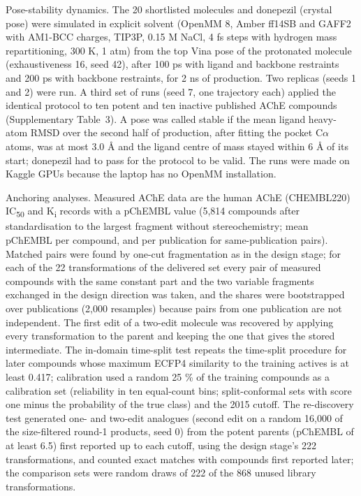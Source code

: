 \documentclass[11pt,a4paper]{article}
\begin{document}
Pose-stability dynamics. The 20 shortlisted molecules and donepezil (crystal pose) were simulated in explicit solvent (OpenMM 8, Amber ff14SB and GAFF2 with AM1-BCC charges, TIP3P, 0.15 M NaCl, 4 fs steps with hydrogen mass repartitioning, 300 K, 1 atm) from the top Vina pose of the protonated molecule (exhaustiveness 16, seed 42), after 100 ps with ligand and backbone restraints and 200 ps with backbone restraints, for 2 ns of production. Two replicas (seeds 1 and 2) were run. A third set of runs (seed 7, one trajectory each) applied the identical protocol to ten potent and ten inactive published AChE compounds (Supplementary Table~3). A pose was called stable if the mean ligand heavy-atom RMSD over the second half of production, after fitting the pocket C$\alpha$ atoms, was at most 3.0 \AA{} and the ligand centre of mass stayed within 6 \AA{} of its start; donepezil had to pass for the protocol to be valid. The runs were made on Kaggle GPUs because the laptop has no OpenMM installation.

Anchoring analyses. Measured AChE data are the human AChE (CHEMBL220) IC\textsubscript{50} and K\textsubscript{i} records with a pChEMBL value (5,814 compounds after standardisation to the largest fragment without stereochemistry; mean pChEMBL per compound, and per publication for same-publication pairs). Matched pairs were found by one-cut fragmentation as in the design stage; for each of the 22 transformations of the delivered set every pair of measured compounds with the same constant part and the two variable fragments exchanged in the design direction was taken, and the shares were bootstrapped over publications (2,000 resamples) because pairs from one publication are not independent. The first edit of a two-edit molecule was recovered by applying every transformation to the parent and keeping the one that gives the stored intermediate. The in-domain time-split test repeats the time-split procedure for later compounds whose maximum ECFP4 similarity to the training actives is at least 0.417; calibration used a random 25 \% of the training compounds as a calibration set (reliability in ten equal-count bins; split-conformal sets with score one minus the probability of the true class) and the 2015 cutoff. The re-discovery test generated one- and two-edit analogues (second edit on a random 16,000 of the size-filtered round-1 products, seed 0) from the potent parents (pChEMBL of at least 6.5) first reported up to each cutoff, using the design stage's 222 transformations, and counted exact matches with compounds first reported later; the comparison sets were random draws of 222 of the 868 unused library transformations.
\end{document}
